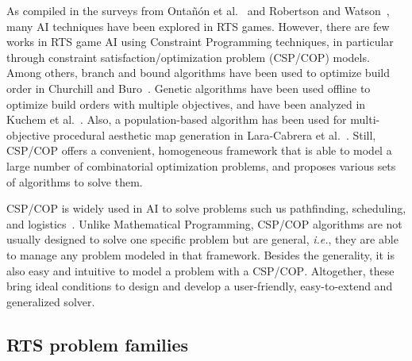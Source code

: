 \documentclass[journal]{IEEEtran}
\newcommand{\csp}{\textsc{CSP}\xspace}
\newcommand{\cop}{\textsc{COP}\xspace}
\newcommand{\ie}{\textit{i.e.}}
\begin{document}

As compiled in the surveys from  Onta{\~n}{\'o}n  et
al.~\cite{OntanonSURCM13} and Robertson and Watson~\cite{RobertsonW14},
many AI techniques have been explored in RTS games. 
% 
However,  there  are  few  works  in  RTS  game  AI  using  Constraint
Programming    techniques,    in   particular    through    constraint
satisfaction/optimization problem  (\csp/\cop) models.   Among others,
branch and bound algorithms have been  used to optimize build order in
Churchill and Buro~\cite{ChurchillB11}.   Genetic algorithms have been
used offline to  optimize build orders with  multiple objectives, and
have  been   analyzed  in   Kuchem  et  al.~\cite{KuchemPR13}.   Also,  a
population-based   algorithm  has   been   used  for   multi-objective
procedural    aesthetic   map    generation    in   Lara-Cabrera    et
al.~\cite{LaraCF14}.    Still,   \csp/\cop    offers   a   convenient,
homogeneous framework that is able to model a large number of combinatorial optimization problems,  and proposes  various  sets of  algorithms to solve them.

\csp/\cop is widely used in  AI to solve problems
such us  pathfinding, scheduling,  and  logistics~\cite{constraint_survey}.  Unlike  Mathematical
Programming, \csp/\cop  algorithms are  not usually designed  to solve
one  specific problem  but are  general, \ie, they are able  to manage  any problem
modeled in that framework. Besides the generality, it is also easy and
intuitive  to model  a problem  with a  \csp/\cop.  Altogether,  these
bring  ideal  conditions  to   design  and  develop  a  user-friendly,
easy-to-extend and generalized solver.


\subsection{RTS problem families}
\end{document}
